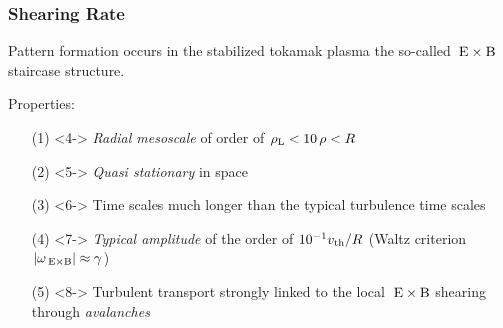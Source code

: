 \documentclass[compress,aspectratio=1610,noflama]{beamer}
\begin{document}
	\begin{frame}
		\frametitle{Shearing Rate}

		 Pattern formation occurs in the stabilized tokamak plasma the so-called $\mathrm{\:E}\times\mathrm{B}$ staircase structure. \\\bigskip
		
		 Properties:
		\begin{enumerate}
			\item[(1)] <4-> \textit{Radial mesoscale} of order of $\rho_\mathrm{L} < 10\,\rho < R$
			\item[(2)] <5-> \textit{Quasi stationary} in space 
			\item[(3)] <6-> Time scales much longer than the typical turbulence time scales
			\item[(4)] <7-> \textit{Typical amplitude} of the order of $10^{-1} v_{\mathrm{th}}/R$ (Waltz criterion $|\omega_{\mathrm{\:E \times B}}|\approx\gamma$)
			\item[(5)] <8-> Turbulent transport strongly linked to the local $\mathrm{\:E}\times\mathrm{B}$ shearing through \textit{avalanches}
		\end{enumerate}
	\end{frame}
\end{document}

